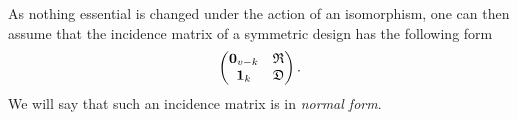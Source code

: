 \documentclass[../../../main]{subfiles}
\begin{document}
\begin{defin}
As nothing essential is changed under the action of an isomorphism, one can then assume that the incidence matrix of a symmetric design has the following form
\begin{equation}
    \begin{pmatrix}
     \mathbf{0}_{v-k} & \mathfrak{R} \\
     \mathbf{1}_k & \mathfrak{D}
    \end{pmatrix}.
\end{equation}
We will say that such an incidence matrix is in {\it normal form}.
\end{defin}

\dinkus

\biblio
\end{document}

